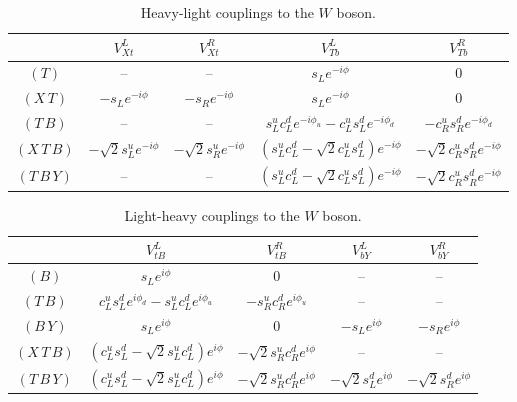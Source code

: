 \documentclass[12pt,a4paper]{article}
\newcommand{\ts}{$(T)$}
\newcommand{\bs}{$(B)$}
\newcommand{\xt}{$(X\,T)$}
\newcommand{\tb}{$(T\,B)$}
\newcommand{\by}{$(B\,Y)$}
\newcommand{\xtb}{$(X\,T\,B)$}
\newcommand{\tby}{$(T\,B\,Y)$}
\newcommand{\slx}{s_L}
\newcommand{\slu}{s_L^u}
\newcommand{\sld}{s_L^d}
\newcommand{\clu}{c_L^u}
\newcommand{\cld}{c_L^d}
\newcommand{\srx}{s_R}
\newcommand{\sru}{s_R^u}
\newcommand{\srd}{s_R^d}
\newcommand{\cru}{c_R^u}
\newcommand{\crd}{c_R^d}
\newcommand{\sqt}{\sqrt{2}}
\begin{document}
\begin{table}[htb]
\begin{center}
\begin{tabular}{c|cccc}
& $V_{Xt}^L$ & $V_{Xt}^R$ & $V_{Tb}^L$ & $V_{Tb}^R$ 
\\ \hline
\ts & -- & -- & $\slx e^{-i \phi}$ & 0 
\\
\xt & $-\slx e^{-i\phi}$ & $-\srx e^{-i\phi}$ & $\slx e^{-i\phi}$ & 0 
\\
\tb & -- & -- & $\slu \cld e^{-i \phi_u} - \clu \sld e^{-i \phi_d}$ & $-\cru \srd e^{-i \phi_d}$
\\
\xtb & $-\sqt \slu e^{-i\phi}$ & $-\sqt \sru e^{-i\phi}$ & $(\slu \cld - \sqt \clu \sld) e^{-i\phi}$ & $-\sqt \cru \srd e^{-i\phi}$
\\
\tby & -- & -- & $(\slu \cld - \sqt \clu \sld) e^{-i\phi}$ & $-\sqt \cru \srd e^{-i\phi}$
%
\end{tabular}
\caption{Heavy-light couplings to the $W$ boson.}
\label{tab:WHl}
\end{center}
\end{table}



\begin{table}[htb]
\begin{center}
\begin{tabular}{c|cccc}
& $V_{tB}^L$ & $V_{tB}^R$ & $V_{bY}^L$ & $V_{bY}^R$
\\ \hline
\bs & $\slx e^{i\phi}$ & 0 & -- & --
\\
\tb & $\clu \sld e^{i \phi_d}-\slu \cld e^{i \phi_u}$ & $-\sru \crd e^{i \phi_u}$ & -- & --
\\
\by & $\slx e^{i\phi}$ & 0 & $-\slx e^{i\phi}$ & $-\srx e^{i\phi}$
\\
\xtb & $(\clu \sld - \sqt \slu \cld) e^{i\phi}$ & $-\sqt \sru \crd e^{i\phi}$ & -- & --
\\
\tby & $(\clu \sld - \sqt \slu \cld)e^{i\phi}$ & $-\sqt \sru \crd e^{i\phi}$ & $-\sqt \sld e^{i\phi}$ & $-\sqt \srd e^{i\phi}$
%
\end{tabular}
\caption{Light-heavy couplings to the $W$ boson.}
\label{tab:WlH}
\end{center}
\end{table}
\end{document}
